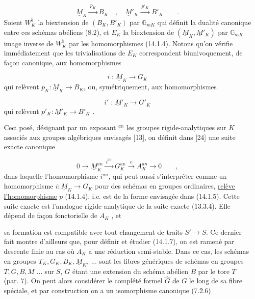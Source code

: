 \begin{equation}\tag{14.1.4}
\underline{M}_K \xrightarrow{\ p_K\ } B_K \quad , \quad \underline{M}'_K \xrightarrow{\ p'_K\ } B'_K \qquad .
\end{equation}
Soient $W_K^{\natural}$ la biextension de $(B_K,B'_K)$ par $\mathbb{G}_{mK}$ qui définit la dualité canonique entre ces schémas abéliens (8.2), et $E_K$ la biextension de $(\underline{M}_K,\underline{M}'_K)$ par $\mathbb{G}_{mK}$ image inverse de $W_K^{\natural}$ par les homomorphismes (14.1.4). Notons qu'on vérifie immédiatement que les trivialisations de $E_K$ correspondent biunivoquement, de façon canonique, aux homomorphismes

\begin{equation}\tag{14.1.5}
i \ : \ \underline{M}_K \longrightarrow G_K
\end{equation}
qui relèvent $p_K : \underline{M}_K \longrightarrow B_K$, ou, symétriquement, aux homomorphismes

\begin{equation}\tag{14.1.6}
i' \ : \ \underline{M}'_K \longrightarrow G'_K
\end{equation}
qui relèvent $p'_K : \underline{M}'_K \longrightarrow B'_K$ .

Ceci posé, désignant par un exposant ${}^{an}$ les groupes rigide-analytiques sur $K$ associés aux groupes algébriques envisagés [13], on définit dans [24] une suite exacte canonique

\begin{equation}\tag{14.1.7}
0 \longrightarrow \underline{M}_K^{an} \xrightarrow{\ i^{an}\ } G_K^{an} \xrightarrow{\ e\ } A_K^{an} \longrightarrow 0 \qquad ,
\end{equation}
dans laquelle l'homomorphisme $i^{an}$, qui peut aussi s'interpréter comme un homomorphisme $i: \underline{M}_K \longrightarrow G_K$ pour des schémas en groupes ordinaires, \underline{relève l'homomorphisme} $p$ (14.1.4), i.e. est de la forme envisagée dans (14.1.5). Cette suite exacte est l'analogue rigide-analytique de la suite exacte (13.3.4). Elle dépend de façon fonctorielle de $A_K$ , et



sa formation est compatible avec tout changement de traits $S' \longrightarrow S$. Ce dernier fait montre d'ailleurs que, pour définir et étudier (14.1.7), on est ramené par descente finie au cas où $A_K$ a une réduction semi-stable. Dans ce cas, les schémas en groupes $T_K,G_K,B_K,\underline{M}_K$, ... sont les fibres génériques de schémas en groupes $T,G,B,M$ ... sur $S$, $G$ étant une extension du schéma abélien $B$ par le tore $T$ (par. 7). On peut alors considérer le complété formel $\hat{G}$ de $G$ le long de sa fibre spéciale, et par construction on a un isomorphisme canonique (7.2.6)

